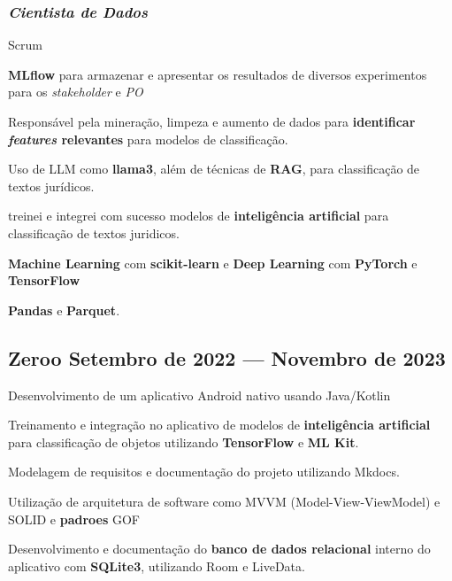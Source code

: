 \documentclass[a4paper,12pt]{article}
\begin{document}
\subsubsection*{\normalsize \textit{Cientista de Dados}}
\vspace{-1em}
\vspace{-0.5em}
\begin{zitemize}
    \item Scrum
    \item \textbf{MLflow} para armazenar e apresentar os resultados de diversos experimentos para os \textit{stakeholder} e \textit{PO}
    \item Responsável pela mineração, limpeza e aumento de dados para \textbf{identificar \textit{features} relevantes} para modelos de classificação.
    \item Uso de LLM como \textbf{llama3}, além de técnicas de \textbf{RAG}, para classificação de textos jurídicos.
    \item treinei e integrei com sucesso modelos de \textbf{inteligência artificial} para classificação de textos juridicos.
    \item \textbf{Machine Learning} com \textbf{ scikit-learn} e \textbf{Deep Learning} com \textbf{PyTorch} e  \textbf{TensorFlow}
    \item \textbf{Pandas} e \textbf{Parquet}.
\end{zitemize}

\vspace{1.5em}
\vspace*{7pt}
\vspace{1.5em}

\subsection*{\large Zeroo \hfill Setembro de 2022 --- Novembro de 2023}

\vspace{-0.5em}
\begin{zitemize}
    \item Desenvolvimento de um aplicativo Android nativo usando Java/Kotlin
    \item Treinamento e integração no aplicativo de modelos de \textbf{inteligência artificial} para classificação de objetos utilizando \textbf{TensorFlow} e \textbf{ML Kit}.  
    \item Modelagem de requisitos e documentação do projeto utilizando Mkdocs.
    \item Utilização de arquitetura de software como MVVM (Model-View-ViewModel) e SOLID e \textbf{padroes} GOF
    \item Desenvolvimento e documentação do \textbf{banco de dados relacional} interno do aplicativo com \textbf{SQLite3}, utilizando Room e LiveData.
\end{zitemize}
\end{document}
